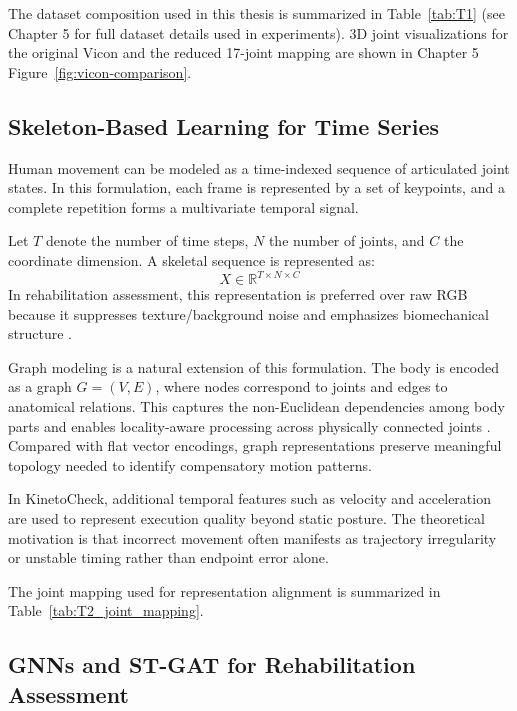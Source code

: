 The dataset composition used in this thesis is summarized in Table~\ref{tab:T1} (see Chapter 5 for full dataset details used in experiments). 3D joint visualizations for the original Vicon and the reduced 17-joint mapping are shown in Chapter 5 Figure~\ref{fig:vicon-comparison}.

\subsection{Skeleton-Based Learning for Time Series}
\label{subsec:skeleton-learning}

Human movement can be modeled as a time-indexed sequence of articulated joint states. In this formulation, each frame is represented by a set of keypoints, and a complete repetition forms a multivariate temporal signal.

Let $T$ denote the number of time steps, $N$ the number of joints, and $C$ the coordinate dimension. A skeletal sequence is represented as:
\begin{equation}
X \in \mathbb{R}^{T \times N \times C}
\end{equation}
In rehabilitation assessment, this representation is preferred over raw RGB because it suppresses texture/background noise and emphasizes biomechanical structure \cite{ZGAA25}.

Graph modeling is a natural extension of this formulation. The body is encoded as a graph $G = (V,E)$, where nodes correspond to joints and edges to anatomical relations. This captures the non-Euclidean dependencies among body parts and enables locality-aware processing across physically connected joints \cite{CXJS22,GYDD18}. Compared with flat vector encodings, graph representations preserve meaningful topology needed to identify compensatory motion patterns.

In KinetoCheck, additional temporal features such as velocity and acceleration are used to represent execution quality beyond static posture. The theoretical motivation is that incorrect movement often manifests as trajectory irregularity or unstable timing rather than endpoint error alone.

The joint mapping used for representation alignment is summarized in Table~\ref{tab:T2_joint_mapping}.



\subsection{GNNs and ST-GAT for Rehabilitation Assessment}
\label{subsec:gnn-stgat}

